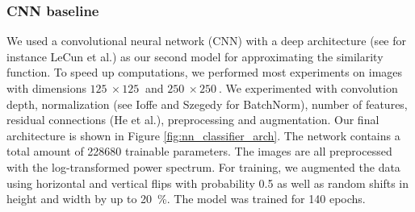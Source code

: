 \documentclass[10pt,conference,compsocconf]{IEEEtran}
\begin{document}
\subsubsection{CNN baseline} %
We used a convolutional neural network (CNN) with a deep architecture (see for instance LeCun et al.\@ \cite{DeepLearning}) as our second model for approximating the similarity function. To speed up computations, we performed most experiments on images with dimensions $\SI{125}{}\times\SI{125}{}$ and $\SI{250}{}\times\SI{250}{}$. We experimented with convolution depth, normalization (see Ioffe and Szegedy \cite{BatchNorm} for BatchNorm), number of features, residual connections (He et al.\@ \cite{ResNet}), preprocessing and augmentation.
Our final architecture is shown in Figure \ref{fig:nn_classifier_arch}. The network contains a total amount of \SI{228680}{} trainable parameters. The images are all preprocessed with the log-transformed power spectrum. For training, we augmented the data using horizontal and vertical flips with probability \SI{0.5}{} as well as random shifts in height and width by up to \SI{20}{\percent}. The model was trained for \SI{140}{} epochs. %
\end{document}
